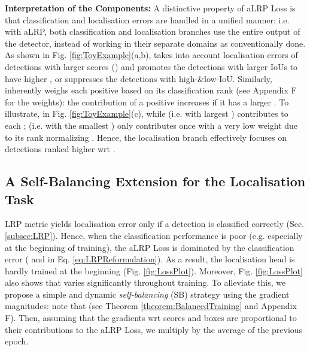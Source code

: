 \documentclass{article}
\begin{document}
\textbf{Interpretation of the Components:} A distinctive property of aLRP Loss is that classification  and  localisation errors are handled in a unified manner: i.e. with aLRP, both  classification and localisation branches use the entire output of the detector, instead of working in their separate domains as conventionally done. As shown in Fig. \ref{fig:ToyExample}(a,b),   takes into account localisation errors of detections with larger scores () and promotes the detections with larger IoUs to have higher , or suppresses the detections with high-\&low-IoU.  Similarly,  inherently weighs each positive based on its classification rank (see Appendix F for the weights): the contribution of a positive increases if it has a larger . To illustrate, in Fig. \ref{fig:ToyExample}(c), while  (i.e. with largest ) contributes to each ;  (i.e. with the smallest ) only contributes once with a very low weight due to its rank normalizing . Hence,  the localisation branch effectively focuses on detections ranked higher wrt .  


\subsection{A Self-Balancing Extension for the Localisation Task}\label{sect:self_balance}
LRP metric yields localisation error only if a detection is classified correctly (Sec. \ref{subsec:LRP}). Hence,  when the classification performance is poor (e.g. especially at the beginning of training), the aLRP Loss is dominated by the classification error ( and  in Eq. \eqref{eq:LRPReformulation}). As a result,  the localisation head is hardly trained at the beginning (Fig. \ref{fig:LossPlot}). Moreover, Fig. \ref{fig:LossPlot} also shows that  varies significantly throughout training. To alleviate this, we propose a simple and dynamic \textit{self-balancing} (SB) strategy using the gradient magnitudes: note that  (see Theorem \ref{theorem:BalancedTraining} and Appendix F). Then, assuming that the gradients wrt scores and boxes are proportional to  their contributions to the aLRP Loss, we multiply  by the average  of the previous epoch. 
\end{document}
